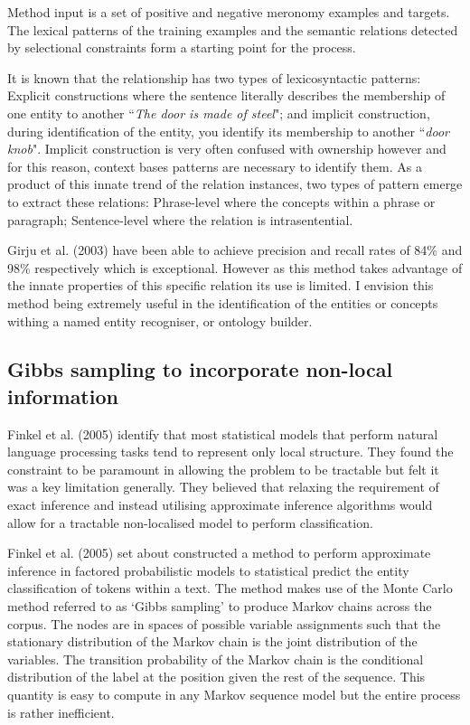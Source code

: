 \documentclass{ecmm427_assignment}
\begin{document}
Method input is a set of positive and negative meronomy examples and targets. The lexical patterns of the training examples and the semantic relations detected by selectional constraints form a starting point for the process.

It is known that the relationship has two types of lexicosyntactic patterns: Explicit constructions where the sentence literally describes the membership of one entity to another ``\textit{The door is made of steel}"; and implicit construction, during identification of the entity, you identify its membership to another ``\textit{door knob}". Implicit construction is very often confused with ownership however and for this reason, context bases patterns are necessary to identify them. As a product of this innate trend of the relation instances, two types of pattern emerge to extract these relations: Phrase-level where the concepts within a phrase or paragraph; Sentence-level where the relation is intrasentential.

Girju et al. (2003) have been able to achieve precision and recall rates of 84\% and 98\% respectively which is exceptional. However as this method takes advantage of the innate properties of this specific relation its use is limited. I envision this method being extremely useful in the identification of the entities or concepts withing a named entity recogniser, or ontology builder. 

\subsection{Gibbs sampling to incorporate non-local information}

Finkel et al. (2005) identify that most statistical models that perform natural language processing tasks tend to represent only local structure. They found the constraint to be paramount in allowing the problem to be tractable but felt it was a key limitation generally. They believed that relaxing the requirement of exact inference and instead utilising approximate inference algorithms would allow for a tractable non-localised model to perform classification.

Finkel et al. (2005) set about constructed a method to perform approximate inference in factored probabilistic models to statistical predict the entity classification of tokens within a text. The method makes use of the Monte Carlo method referred to as `Gibbs sampling' to produce Markov chains across the corpus. The nodes are in spaces of possible variable assignments such that the stationary distribution of the Markov chain is the joint distribution of the variables. The transition probability of the Markov chain is the conditional distribution of the label at the position given the rest of the sequence. This quantity is easy to compute in any Markov sequence model but the entire process is rather inefficient.
\end{document}
